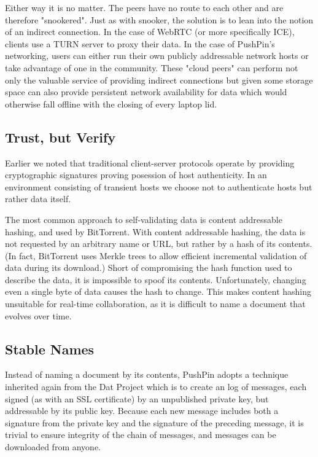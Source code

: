 \documentclass[sigplan,10pt]{acmart}
\begin{document}
Either way it is no matter. The peers have no route to each other and are therefore "snookered". Just as with snooker, the solution is to lean into the notion of an indirect connection. In the case of WebRTC (or more specifically ICE\cite{ICE}), clients use a TURN \cite{TURN} server to proxy their data. In the case of PushPin's networking, users can either run their own publicly addressable network hosts or take advantage of one in the community. These "cloud peers" can perform not only the valuable service of providing indirect connections but given some storage space can also provide persistent network availability for data which would otherwise fall offline with the closing of every laptop lid.   

\subsection{Trust, but Verify}

Earlier we noted that traditional client-server protocols operate by providing cryptographic signatures proving posession of host authenticity. In an environment consisting of transient hosts we choose not to authenticate hosts but rather data itself. 

The most common approach to self-validating data is content addressable hashing, and used by BitTorrent. With content addressable hashing, the data is not requested by an arbitrary name or URL, but rather by a hash of its contents. (In fact, BitTorrent uses Merkle trees \cite{MerkleTrees} to allow efficient incremental validation of data during its download.) Short of compromising the hash function used to describe the data, it is impossible to spoof its contents. Unfortunately, changing even a single byte of data causes the hash to change. This makes content hashing unsuitable for real-time collaboration, as it is difficult to name a document that evolves over time.

\subsection{Stable Names}

Instead of naming a document by its contents, PushPin adopts a technique inherited again from the Dat Project \cite{DatProject} which is to create an log of messages, each signed (as with an SSL certificate) by an unpublished private key, but addressable by its public key. Because each new message includes both a signature from the private key and the signature of the preceding message, it is trivial to ensure integrity of the chain of messages, and messages can be downloaded from anyone.
\end{document}
